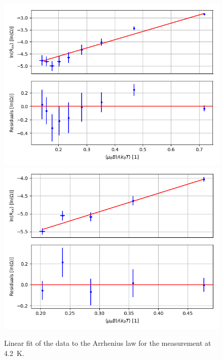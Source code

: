 \documentclass[12pt,a4paper]{article}
\begin{document}
\begin{figure} [H]
\centering
\includegraphics[scale=0.5]{Bilder/Elektron_g/4_2/lin_fit_Arrhenius_law_1.PNG}
\includegraphics[scale=0.5]{Bilder/Elektron_g/4_2/lin_fit_Arrhenius_law_2.PNG}
\caption{Linear fit of the data to the Arrhenius law for the measurement at \SI{4.2}{K}.}
\end{figure}
\end{document}
